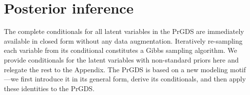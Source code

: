 \documentclass{article}
\begin{document}







\section{Posterior inference}
\label{sec:mcmc}
The complete conditionals for all latent variables in the PrGDS are immediately available in closed form without any data augmentation. Iteratively re-sampling each variable from its conditional constitutes a Gibbs sampling algorithm. We provide conditionals for the latent variables with non-standard priors here and relegate the rest to the Appendix. The PrGDS is based on a new modeling motif---we first introduce it in its general form, derive its conditionals, and then apply these identities to the PrGDS.~
\end{document}
